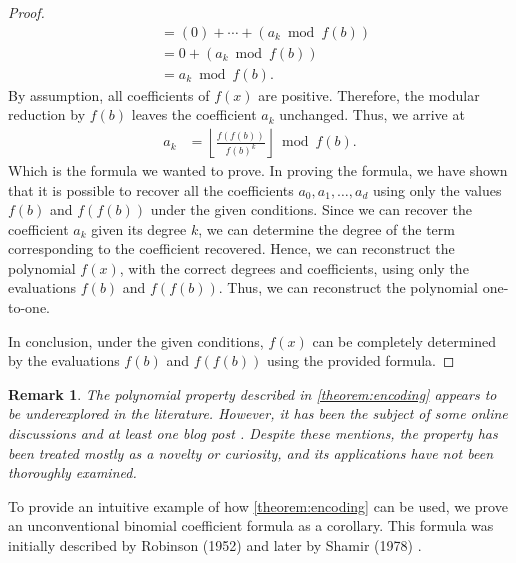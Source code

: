 \documentclass{article}
\theoremstyle{plain}
\newtheorem{remark}{Remark}
\theoremstyle{definition}
\newcommand{\floor}[1]{\left\lfloor #1 \right\rfloor}
\begin{document}
\begin{proof}
\begin{align*}
&= (0) + \cdots + (a_{k} \bmod{f(b)}) \\
&= 0 + (a_{k} \bmod{f(b)}) \\
&= a_{k} \bmod{f(b)} .
\end{align*}
By assumption, all coefficients of $f(x)$ are positive. Therefore, the modular reduction by $f(b)$ leaves the coefficient $a_k$ unchanged. Thus, we arrive at
\begin{align*}
a_k &= \floor{\frac{f(f(b))}{f(b)^{k}}} \bmod{f(b)} .
\end{align*}
Which is the formula we wanted to prove. In proving the formula, we have shown that it is possible to recover all the coefficients $a_0, a_1, \ldots, a_d$ using only the values $f(b)$ and $f(f(b))$ under the given conditions. Since we can recover the coefficient $a_k$ given its degree $k$, we can determine the degree of the term corresponding to the coefficient recovered. Hence, we can reconstruct the polynomial $f(x)$, with the correct degrees and coefficients, using only the evaluations $f(b)$ and $f(f(b))$. Thus, we can reconstruct the polynomial one-to-one.

In conclusion, under the given conditions, $f(x)$ can be completely determined by the evaluations $f(b)$ and $f(f(b))$ using the provided formula.
\end{proof}

\begin{remark}
The polynomial property described in \cref{theorem:encoding} appears to be underexplored in the literature. However, it has been the subject of some online discussions \cite{mathoverflow2012application, reddit2023determine} and at least one blog post \cite{jcook2012polynomial}. Despite these mentions, the property has been treated mostly as a novelty or curiosity, and its applications have not been thoroughly examined.
\end{remark}

To provide an intuitive example of how \cref{theorem:encoding} can be used, we prove an unconventional binomial coefficient formula as a corollary. This formula was initially described by Robinson (1952) \cite{robinson1952arithmetic} and later by Shamir (1978) \cite{shamir1978factoring}.
\end{document}
